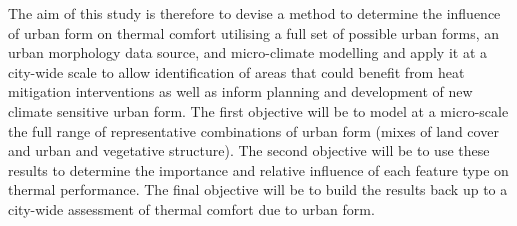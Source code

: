 \documentclass[final,3p,times,authoryear]{elsarticle}
\begin{document}


The aim of this study is therefore to devise a method to determine the influence of urban form on thermal comfort utilising a full set of possible urban forms, an urban morphology data source, and micro-climate modelling and apply it at a city-wide scale to allow identification of areas that could benefit from heat mitigation interventions as well as inform planning and development of new climate sensitive urban form. The first objective will be to model at a micro-scale the full range of representative combinations of urban form (mixes of land cover and urban and vegetative structure). The second objective will be to use these results to determine the importance and relative influence of each feature type on thermal performance. The final objective will be to build the results back up to a city-wide assessment of thermal comfort due to urban form.

\end{document}
